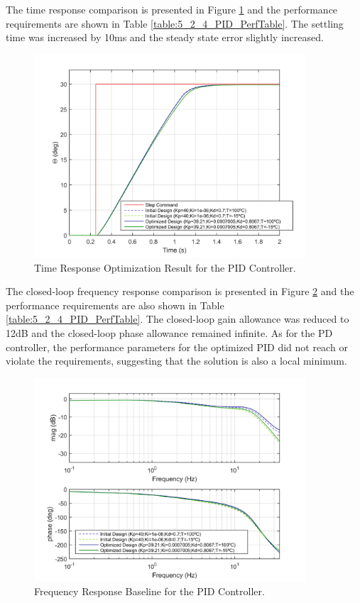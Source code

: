 The time response comparison is presented in Figure \ref{fig:5_2_4_PID_TimeResp} and the performance requirements are shown in Table \ref{table:5_2_4_PID_PerfTable}. The settling time was increased by 10ms and the steady state error slightly increased. 

\begin{figure}[H]
	\centering
	\centerline{\includegraphics[width=0.9\textwidth]{Figuras/5.OptimizationResults/5-2-4-PID-TimeResponseComparison.jpg}}
	\caption{Time Response Optimization Result for the PID Controller.}
	\label{fig:5_2_4_PID_TimeResp}
\end{figure}

The closed-loop frequency response comparison is presented in Figure \ref{fig:5_2_4_PID_FreqResp} and the performance requirements are also shown in Table \ref{table:5_2_4_PID_PerfTable}. The closed-loop gain allowance was reduced to 12dB and the closed-loop phase allowance remained infinite. As for the PD controller, the performance parameters for the optimized PID did not reach or violate the requirements, suggesting that the solution is also a local minimum.

\begin{figure}[H]
	\centering
	\centerline{\includegraphics[width=0.9\textwidth]{Figuras/5.OptimizationResults/5-2-4-PID-FrequencyResponseComparison.jpg}}
	\caption{Frequency Response Baseline for the PID Controller.}
	\label{fig:5_2_4_PID_FreqResp}
\end{figure}

